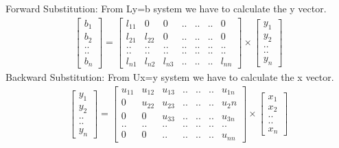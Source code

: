 \documentclass[a4paper, 10pt]{article}
\begin{document}
\noindent Forward Substitution: From Ly=b system we have to calculate the y vector.\\
\begin{equation*}
\begin{matrix}
	\begin{bmatrix}
	b_1\\ b_2\\ ..\\ ..\\ b_n
	\end{bmatrix}
=  
	\begin{bmatrix}
	l_{11} & 0 & 0 & .. & .. & .. & 0\\
	l_{21} & l_{22} & 0 & ..& ..& .. & 0\\
	.. & .. & .. & .. & .. & .. & ..\\
	.. & .. & .. & .. & .. & .. & ..\\
	l_{n1} & l_{n2} & l_{n3} & .. & .. & .. & l_{nn}
	
	\end{bmatrix}
	  \times
	  \begin{bmatrix}
	 	y_1\\ y_2\\ ..\\ ..\\ y_n
	 	\end{bmatrix}
\end{matrix}
\end{equation*}
Backward Substitution: From Ux=y system we have to calculate the x vector.\\
\begin{equation*}
\begin{matrix}
	\begin{bmatrix}
	y_1\\ y_2\\ ..\\ ..\\ y_n
	\end{bmatrix}
=  
	\begin{bmatrix}
	u_{11} & u_{12} & u_{13} & .. & .. & .. & u_{1n}\\
	0 & u_{22} & u_{23} & ..& ..& .. & u_2n\\
	0 & 0 & u_{33} & .. & ..& .. & u_{3n}\\
	.. & .. & .. & .. & .. & .. & ..\\
	0 & 0 & .. & .. & .. & ..& u_{nn}
	
	\end{bmatrix}
	  \times
	  \begin{bmatrix}
	 	x_1\\ x_2\\ ..\\ ..\\ x_n
	 	\end{bmatrix}
\end{matrix}
\end{equation*}
\end{document}
